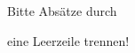 \documentclass[NEUTRAL]{tumfax}
\begin{document}
\begin{tumfax}
Bitte Abs\"atze durch

eine Leerzeile trennen!
\end{tumfax}
\end{document}
